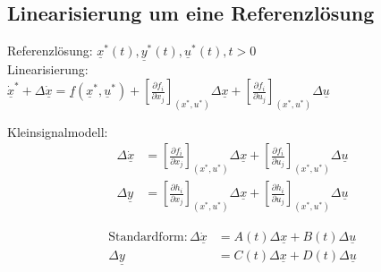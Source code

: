 \documentclass[german]{latex4ei/latex4ei_sheet}
\begin{document}
\begin{sectionbox}
\subsection{Linearisierung um eine Referenzlösung}

Referenzlösung: $\underline{x}^*(t), \underline{y}^*(t), \underline{u}^*(t), t > 0$ \\

Linearisierung: \\
$\underline{\dot{x}}^* + \Delta\underline{\dot{x}} = \underline{f}\left( \underline{x}^*, \underline{u}^* \right) +
\left[ \frac{\partial f_i}{\partial x_j} \right]_{(x^*, u^*)} \Delta\underline{x} +
\left[ \frac{\partial f_i}{\partial u_j} \right]_{(x^*, u^*)} \Delta\underline{u}
$

Kleinsignalmodell:
\begin{align*}
  \Delta \underline{\dot{x}}    &=  \left[ \frac{\partial f_i}{\partial x_j} \right]_{(x^*, u^*)} \Delta\underline{x} +
                                    \left[ \frac{\partial f_i}{\partial u_j} \right]_{(x^*, u^*)} \Delta\underline{u} \\
  \Delta \underline{{y}}        &=  \left[ \frac{\partial h_i}{\partial x_j} \right]_{(x^*, u^*)} \Delta\underline{x} +
                                    \left[ \frac{\partial h_i}{\partial u_j} \right]_{(x^*, u^*)} \Delta\underline{u}
\end{align*}

\begin{align*}
  \text{Standardform:} \,
  \Delta \underline{\dot{x}}    &=  A(t) \Delta\underline{x} + B(t) \Delta\underline{u} \\
  \Delta \underline{y}          &=  C(t) \Delta\underline{x} + D(t) \Delta\underline{u}
\end{align*}
\end{sectionbox}
\end{document}
